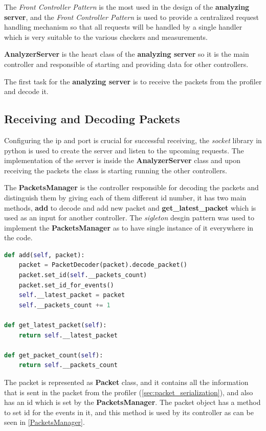 The \textit{Front Controller Pattern} is the most used in the design of the \textbf{analyzing server},
and the \textit{Front Controller Pattern} is used to provide a centralized request handling 
mechanism so that all requests will be handled by a single handler which is very suitable to the various
checkers and measurements.

\textbf{AnalyzerServer} is the heart class of the \textbf{analyzing server} so it is the main controller
and responsible of starting and providing data for other controllers.

The first task for the \textbf{analyzing server} is to receive the packets from the profiler and decode it.

\subsection{Receiving and Decoding Packets}
Configuring the ip and port is crucial for successful receiving, the \textit{socket} library in python
is used to create the server and listen to the upcoming requests. The implementation of the server is
inside the \textbf{AnalyzerServer} class and upon receiving the packets the class is starting running the
other controllers.

The \textbf{PacketsManager} is the controller responsible for decoding the packets and distinguish them
by giving each of them different id number, it has two main methods, \textbf{add} to decode and add new packet
and \textbf{get\_latest\_packet} which is used as an input for another controller. The \textit{sigleton} 
desgin pattern was used to implement the \textbf{PacketsManager} as to have single instance of it 
everywhere in the code.
\newline
\begin{lstlisting}[language=python, label=PacketsManager, caption={puplic methods of PacketsManager},captionpos=b]
def add(self, packet):
	packet = PacketDecoder(packet).decode_packet()
	packet.set_id(self.__packets_count)
	packet.set_id_for_events()
	self.__latest_packet = packet
	self.__packets_count += 1

def get_latest_packet(self):
	return self.__latest_packet

def get_packet_count(self):
	return self.__packets_count

\end{lstlisting}

The packet is represented as \textbf{Packet} class, and it contains all the information that is sent
in the packet from the profiler (\ref{sec:packet_serialization}), and also has an id which is set by the
\textbf{PacketsManager}. The packet object has a method to set id for the events in it, and this method
is used by its controller as can be seen in \ref{PacketsManager}.

